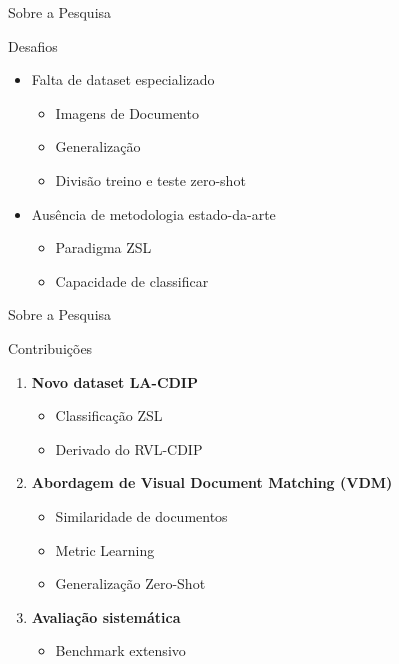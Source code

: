 \begin{frame}{Sobre a Pesquisa}
\begin{block}{Desafios}
    
    \begin{itemize}
        \item {\large Falta de dataset especializado}
        \begin{itemize}
            \item Imagens de Documento
            \item Generalização
            \item Divisão treino e teste zero-shot
        \end{itemize}
        \item {\large Ausência de metodologia estado-da-arte}
        \begin{itemize}
            \item Paradigma ZSL
            \item Capacidade de classificar
        \end{itemize}
    \end{itemize}
    
\end{block}
\end{frame}

\begin{frame}{Sobre a Pesquisa}
\begin{block}{Contribuições}
    \begin{enumerate}
        \item \textbf{Novo dataset LA-CDIP}
        \begin{itemize}
            \item Classificação ZSL
            \item Derivado do RVL-CDIP
        \end{itemize}
        
        \item \textbf{Abordagem de Visual Document Matching (VDM)}
        \begin{itemize}
            \item Similaridade de documentos
            \item Metric Learning
            \item Generalização Zero-Shot
        \end{itemize}
        
        \item \textbf{Avaliação sistemática}
        \begin{itemize}
            \item Benchmark extensivo
        \end{itemize}
    \end{enumerate}
\end{block}
\end{frame}
